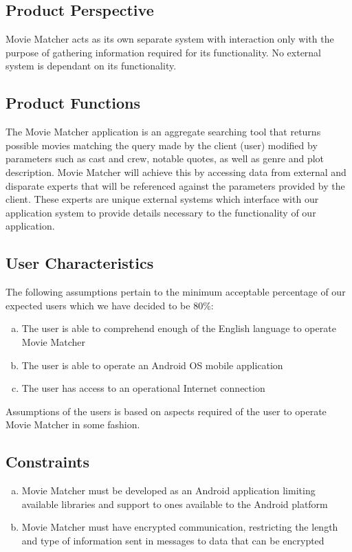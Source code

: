 \documentclass[]{article}
\begin{document}
\subsection{Product Perspective}
\label{sub:product_perspective}
Movie Matcher acts as its own separate system with interaction only with the purpose of gathering information required for its functionality. No external system is dependant on its functionality.

\subsection{Product Functions}
\label{sub:product_functions}
The Movie Matcher application is an aggregate searching tool that returns possible movies matching the query made by the client (user) modified by parameters such as cast and crew, notable quotes, as well as genre and plot description. Movie Matcher will achieve this by accessing data from external and disparate experts that will be referenced against the parameters provided by the client. These experts are unique external systems which interface with our application system to provide details necessary to the functionality of our application.

\subsection{User Characteristics}
\label{sub:user_characteristics}
The following assumptions pertain to the minimum acceptable percentage of our expected users which we have decided to be 80\%:
\begin{enumerate}[a)]
	\item The user is able to comprehend enough of the English language to operate Movie Matcher
	\item The user is able to operate an Android OS mobile application
	\item The user has access to an operational Internet connection
\end{enumerate}
Assumptions of the users is based on aspects required of the user to operate Movie Matcher in some fashion.

\subsection{Constraints}
\label{sub:constraints}
\begin{enumerate}[a)]
	\item Movie Matcher must be developed as an Android application limiting available libraries and support to ones available to the Android platform
	\item Movie Matcher must have encrypted communication, restricting the length and type of information sent in messages to data that can be encrypted
\end{enumerate}
\end{document}
